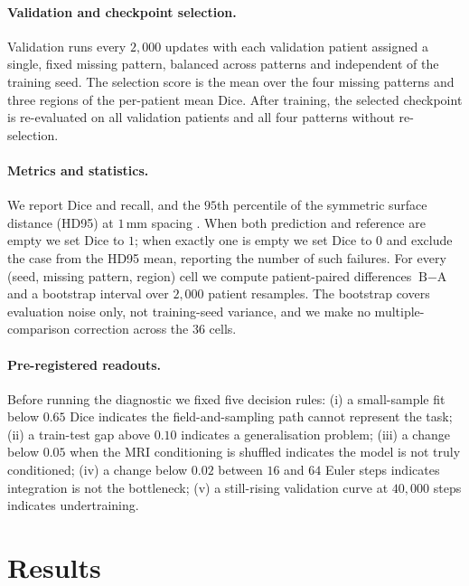 \documentclass[conference]{IEEEtran}
\begin{document}
\paragraph{Validation and checkpoint selection.}
Validation runs every $2{,}000$ updates with each validation patient assigned a
single, fixed missing pattern, balanced across patterns and independent of the
training seed. The selection score is the mean over the four missing patterns
and three regions of the per-patient mean Dice. After training, the selected
checkpoint is re-evaluated on all validation patients and all four patterns
without re-selection.

\paragraph{Metrics and statistics.}
We report Dice and recall, and the $95$th percentile of the symmetric surface
distance (HD95) at $1$\,mm spacing \cite{taha2015metrics}. When both prediction and reference are
empty we set Dice to $1$; when exactly one is empty we set Dice to $0$ and
exclude the case from the HD95 mean, reporting the number of such failures. For
every (seed, missing pattern, region) cell we compute patient-paired differences
$\text{B}-\text{A}$ and a bootstrap interval over $2{,}000$ patient resamples.
The bootstrap covers evaluation noise only, not training-seed variance, and we
make no multiple-comparison correction across the $36$ cells.

\paragraph{Pre-registered readouts.}
Before running the diagnostic we fixed five decision rules: (i) a small-sample
fit below $0.65$ Dice indicates the field-and-sampling path cannot represent
the task; (ii) a train-test gap above $0.10$ indicates a generalisation problem;
(iii) a change below $0.05$ when the MRI conditioning is shuffled indicates the
model is not truly conditioned; (iv) a change below $0.02$ between $16$ and $64$
Euler steps indicates integration is not the bottleneck; (v) a still-rising
validation curve at $40{,}000$ steps indicates undertraining.



\section{Results}
\label{sec:results}
\end{document}

